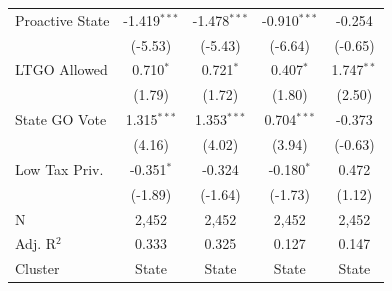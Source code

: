 \begin{tabular*}{\textwidth}{@{\extracolsep{\fill}}lcccc}
   Proactive State      & -1.419$^{***}$            & -1.478$^{***}$                & -0.910$^{***}$                       & -0.254\\   
                        & (-5.53)                  & (-5.43)                      & (-6.64)                             & (-0.65)\\   
   LTGO Allowed         & 0.710$^{*}$               & 0.721$^{*}$                   & 0.407$^{*}$                          & 1.747$^{**}$\\   
                        & (1.79)                   & (1.72)                       & (1.80)                              & (2.50)\\   
   State GO Vote        & 1.315$^{***}$             & 1.353$^{***}$                 & 0.704$^{***}$                        & -0.373\\   
                        & (4.16)                   & (4.02)                       & (3.94)                              & (-0.63)\\   
   Low Tax Priv.        & -0.351$^{*}$              & -0.324                        & -0.180$^{*}$                         & 0.472\\   
                        & (-1.89)                  & (-1.64)                      & (-1.73)                             & (1.12)\\   
   \hline
   N         & 2,452                     & 2,452                         & 2,452                                & 2,452\\  
   Adj. R$^2$       & 0.333                     & 0.325                         & 0.127                                & 0.147\\  
   Cluster              & State & State & State & State\\  
   \bottomrule
\end{tabular*}
\par\endgroup
